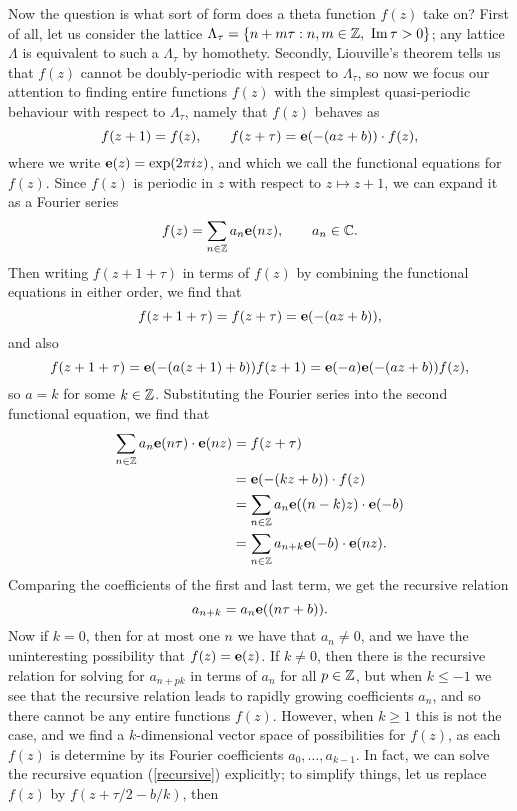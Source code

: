 Now the question is what sort of form does a theta function $f(z)$ take on?  First of all, let us consider the lattice $\Lambda_{\tau} = \{ n + m\tau \st n,m \in \ZZ,\ \im\tau > 0 \}$; any lattice $\Lambda$ is equivalent to such a $\Lambda_{\tau}$ by homothety. Secondly, Liouville's theorem tells us that $f(z)$ cannot be doubly-periodic with respect to $\Lambda_{\tau}$, so now we focus our attention to finding entire functions $f(z)$ with the simplest quasi-periodic behaviour with respect to $\Lambda_{\tau}$, namely that $f(z)$ behaves as
\begin{equation*}
	f(z+1) = f(z),\qquad f(z +\tau) = \mathbf{e}(-(az + b))\cdot f(z),
\end{equation*}
where we write $\mathbf{e}(z) = \exp(2\pi i z)$, and which we call the functional equations for $f(z)$. Since $f(z)$ is periodic in $z$ with respect to $z \mapsto z+1$, we can expand it as a Fourier series
\begin{equation*}
	f(z) = \sum_{n\in\mathbb{Z}}a_{n}\mathbf{e}(n z),\qquad a_{n}\in\mathbb{C}.
\end{equation*}
Then writing $f(z + 1 + \tau)$ in terms of $f(z)$ by combining the functional equations in either order, we find that
\begin{equation*}
	f(z + 1 + \tau) = f(z+\tau) = \mathbf{e}(-(az+b)),
\end{equation*}
and also
\begin{equation*}
	f(z + 1 + \tau) = \mathbf{e}(-(a(z+1) + b))f(z+1) = \mathbf{e}(-a)\mathbf{e}(-(az+b))f(z),
\end{equation*}
so $a = k$ for some $k \in \mathbb{Z}$. Substituting the Fourier series into the second functional equation, we find that
\begin{equation*}
	\begin{split}
	\sum_{n \in\mathbb{Z}}a_{n} \mathbf{e}( n \tau)\cdot\mathbf{e}(n z) &= f(z+\tau)\\
	&=\mathbf{e}(-(kz + b))\cdot f(z)\\
	&= \sum_{n\in\mathbb{Z}}a_{n}\mathbf{e}((n-k)z)\cdot\mathbf{e}(- b)\\
	&= \sum_{n\in\mathbb{Z}} a_{n+k}\mathbf{e}(-b)\cdot \mathbf{e}(n z).
	\end{split}
\end{equation*}
Comparing the coefficients of the first and last term, we get the recursive relation
\begin{equation}
\label{recursive}
	a_{n+k} = a_{n}\mathbf{e}((n\tau + b)).
\end{equation}
Now if $k = 0$, then for at most one $n$ we have that $a_{n} \neq 0$, and we have the uninteresting possibility that $f(z) = \mathbf{e}(z)$. If $k \neq 0$, then there is the recursive relation for solving for $a_{n + pk}$ in terms of $a_{n}$ for all $p \in \mathbb{Z}$, but when $k \leq -1$ we see that the recursive relation leads to rapidly growing coefficients $a_{n}$, and so there cannot be any entire functions $f(z)$. However, when $k \geq 1$ this is not the case, and we find a $k$-dimensional vector space of possibilities for $f(z)$, as each $f(z)$ is determine by its Fourier coefficients $a_{0},\ldots, a_{k-1}$. In fact, we can solve the recursive equation (\ref{recursive}) explicitly; to simplify things, let us replace $f(z)$ by $f(z + \tau/2 - b/k)$, then
